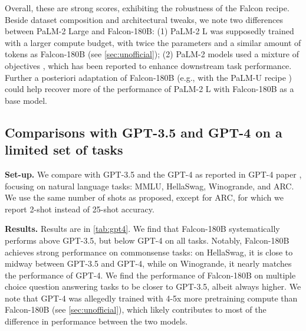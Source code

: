 \documentclass{article}
\begin{document}
\FloatBarrier
\newpage

Overall, these are strong scores, exhibiting the robustness of the Falcon recipe. Beside dataset composition and architectural tweaks, we note two differences between PaLM-2 Large and Falcon-180B: (1) PaLM-2 L was supposedly trained with a larger compute budget, with twice the parameters and a similar amount of tokens as Falcon-180B (see \cref{sec:unofficial}); (2) PaLM-2 models used a mixture of objectives \citep{tay2022ul2}, which has been reported to enhance downstream task performance. Further a posteriori adaptation of Falcon-180B (e.g., with the PaLM-U recipe \citep{tay2022transcending}) could help recover more of the performance of PaLM-2 L with Falcon-180B as a base model.

\subsection{Comparisons with GPT-3.5 and GPT-4 on a limited set of tasks}
\label{sec:gpt}

\textbf{Set-up.} We compare with GPT-3.5 and the GPT-4 as reported in GPT-4 paper \citep{gpt-4}, focusing on natural language tasks: MMLU, HellaSwag, Winogrande, and ARC. We use the same number of shots as proposed, except for ARC, for which we report 2-shot instead of 25-shot accuracy. 

\textbf{Results.} Results are in \cref{tab:gpt4}. We find that Falcon-180B systematically performs above GPT-3.5, but below GPT-4 on all tasks. Notably, Falcon-180B achieves strong performance on commonsense tasks: on HellaSwag, it is close to midway between GPT-3.5 and GPT-4, while on Winogrande, it nearly matches the performance of GPT-4. We find the performance of Falcon-180B on multiple choice question answering tasks to be closer to GPT-3.5, albeit always higher. We note that GPT-4 was allegedly trained with 4-5x more pretraining compute than Falcon-180B (see \cref{sec:unofficial}), which likely contributes to most of the difference in performance between the two models.
\end{document}
